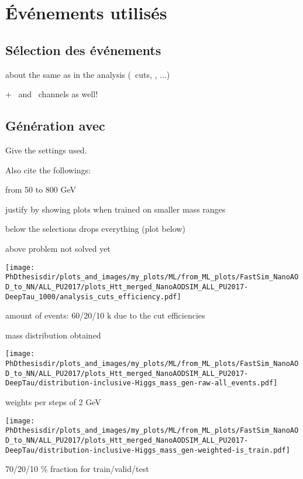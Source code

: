 \section{Événements utilisés}\label{chapter-ML-section-evt_gen}
\subsection{Sélection des événements}
about the same as in the analysis (\pT\ cuts, \DEEPTAU, ...)

+ \ele\ele\ and \mu\mu\ channels as well!

\subsection{Génération avec \FASTSIM}

Give the settings used.

Also cite the followings:





from 50 to 800 GeV

justify by showing plots when trained on smaller mass ranges

below the selections drops everything (plot below)

above problem not solved yet

\texttt{[image: \\PhDthesisdir/plots\_and\_images/my\_plots/ML/from\_ML\_plots/FastSim\_NanoAOD\_to\_NN/ALL\_PU2017/plots\_Htt\_merged\_NanoAODSIM\_ALL\_PU2017-DeepTau\_1000/analysis\_cuts\_efficiency.pdf]}

amount of events: 60/20/10 k due to the cut efficiencies 

mass distribution obtained

\texttt{[image: \\PhDthesisdir/plots\_and\_images/my\_plots/ML/from\_ML\_plots/FastSim\_NanoAOD\_to\_NN/ALL\_PU2017/plots\_Htt\_merged\_NanoAODSIM\_ALL\_PU2017-DeepTau/distribution-inclusive-Higgs\_mass\_gen-raw-all\_events.pdf]}

weights per steps of 2 GeV

\texttt{[image: \\PhDthesisdir/plots\_and\_images/my\_plots/ML/from\_ML\_plots/FastSim\_NanoAOD\_to\_NN/ALL\_PU2017/plots\_Htt\_merged\_NanoAODSIM\_ALL\_PU2017-DeepTau/distribution-inclusive-Higgs\_mass\_gen-weighted-is\_train.pdf]}

70/20/10 \% fraction for train/valid/test
